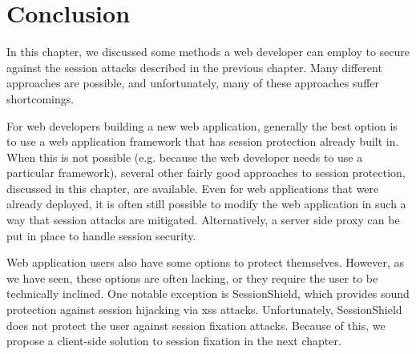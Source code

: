 \section{Conclusion} %

In this chapter, we discussed some methods a web developer can employ to secure against the session attacks described in the previous chapter. Many different approaches are possible, and unfortunately, many of these approaches suffer shortcomings.

For web developers building a new web application, generally the best option is to use a web application framework that has session protection already built in. When this is not possible (e.g. because the web developer needs to use a particular framework), several other fairly good approaches to session protection, discussed in this chapter, are available. Even for web applications that were already deployed, it is often still possible to modify the web application in such a way that session attacks are mitigated. Alternatively, a server side proxy can be put in place to handle session security.

Web application users also have some options to protect themselves. However, as we have seen, these options are often lacking, or they require the user to be technically inclined. One notable exception is SessionShield, which provides sound protection against \gls{session hijacking} via \gls{xss} attacks. Unfortunately, SessionShield does not protect the user against \gls{session fixation} attacks. Because of this, we propose a client-side solution to session fixation in the next chapter.
